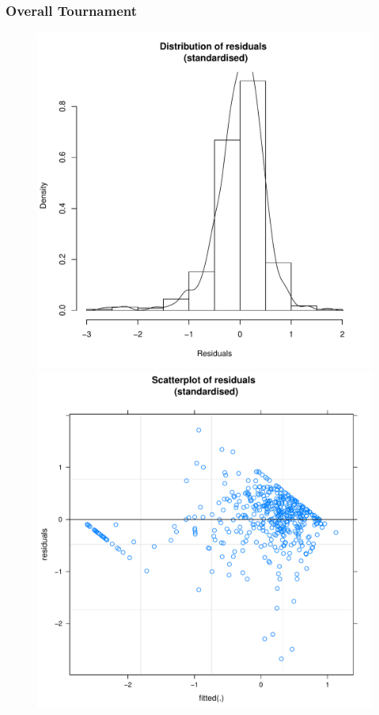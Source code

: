 \begin{CJK}{UTF8}{gbsn}
      \subsubsection{Overall Tournament\label{app8:MLM32a}}




            \begin{figure}[htbp]
              \includegraphics[scale =.4]{images/MLM31bHist.pdf}
              \includegraphics[scale =.4]{images/MLM31bScatter.pdf}

\end{figure}
\end{CJK}
